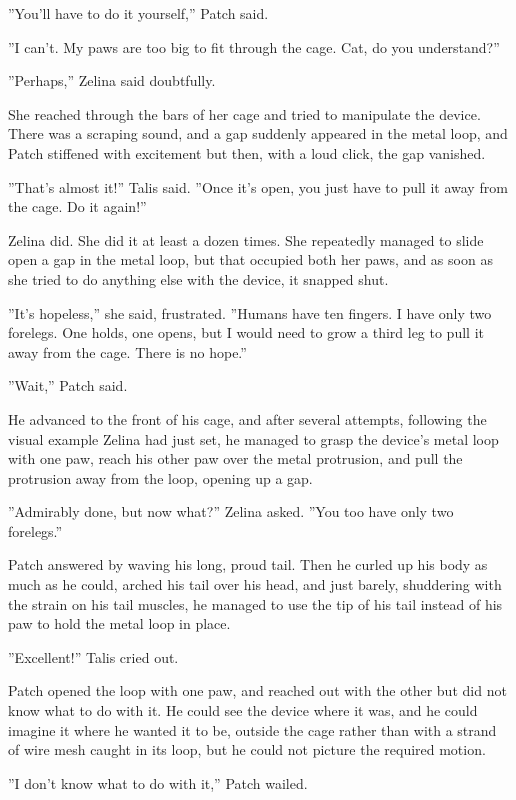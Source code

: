 \documentclass[11pt]{article}
\begin{document}
 ''You'll have to do it yourself,'' Patch said.\par
 ''I can't. My paws are too big to fit through the cage. Cat, do you understand?''\par
 ''Perhaps,'' Zelina said doubtfully.\par
She reached through the bars of her cage and tried to manipulate the device. There was a scraping sound, and a gap suddenly appeared in the metal loop, and Patch stiffened with excitement %
 but then, with a loud click, the gap vanished.\par
''That's almost it!'' Talis said. ''Once it's open, you just have to pull it away from the cage. Do it again!''\par
Zelina did. She did it at least a dozen times. She repeatedly managed to slide open a gap in the metal loop, but that occupied both her paws, and as soon as she tried to do anything else with the device, it snapped shut.\par
''It's hopeless,'' she said, frustrated. ''Humans have ten fingers. I have only two forelegs. One holds, one opens, but I would need to grow a third leg to pull it away from the cage. There is no hope.''\par
''Wait,'' Patch said.\par
He advanced to the front of his cage, and after several attempts, following the visual example Zelina had just set, he managed to grasp the device's metal loop with one paw, reach his other paw over the metal protrusion, and pull the protrusion away from the loop, opening up a gap.\par
''Admirably done, but now what?'' Zelina asked. ''You too have only two forelegs.''\par
Patch answered by waving his long, proud tail. Then he curled up his body as much as he could, arched his tail over his head, and just barely, shuddering with the strain on his tail muscles, he managed to use the tip of his tail instead of his paw to hold the metal loop in place.\par
''Excellent!'' Talis cried out.\par
Patch opened the loop with one paw, and reached out with the other %
 but did not know what to do with it. He could see the device where it was, and he could imagine it where he wanted it to be, outside the cage rather than with a strand of wire mesh caught in its loop, but he could not picture the required motion.\par
''I don't know what to do with it,'' Patch wailed.\par
\end{document}
